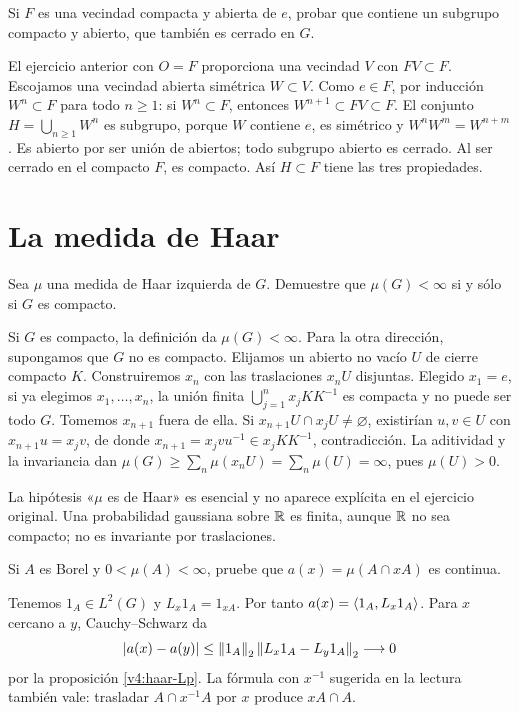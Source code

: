 \begin{ejercicio}\label{ej:v4-l16-9}
Si $F$ es una vecindad compacta y abierta de $e$, probar que contiene un subgrupo compacto y abierto, que también es cerrado en $G$.
\end{ejercicio}
\begin{solucion}
El ejercicio anterior con $O=F$ proporciona una vecindad $V$ con $FV\subset F$. Escojamos una vecindad abierta simétrica $W\subset V$. Como $e\in F$, por inducción $W^n\subset F$ para todo $n\geq1$: si $W^n\subset F$, entonces $W^{n+1}\subset FV\subset F$. El conjunto $H=\bigcup_{n\geq1}W^n$ es subgrupo, porque $W$ contiene $e$, es simétrico y $W^nW^m=W^{n+m}$. Es abierto por ser unión de abiertos; todo subgrupo abierto es cerrado. Al ser cerrado en el compacto $F$, es compacto. Así $H\subset F$ tiene las tres propiedades.
\end{solucion}

\chapter{La medida de Haar}

\begin{ejercicio}\label{ej:v4-l17-1}
Sea $\mu$ una medida de Haar izquierda de $G$. Demuestre que $\mu(G)<\infty$ si y sólo si $G$ es compacto.
\end{ejercicio}
\begin{solucion}
Si $G$ es compacto, la definición da $\mu(G)<\infty$. Para la otra dirección, supongamos que $G$ no es compacto. Elijamos un abierto no vacío $U$ de cierre compacto $K$. Construiremos $x_n$ con las traslaciones $x_nU$ disjuntas. Elegido $x_1=e$, si ya elegimos $x_1,\ldots,x_n$, la unión finita $\bigcup_{j=1}^n x_jKK^{-1}$ es compacta y no puede ser todo $G$. Tomemos $x_{n+1}$ fuera de ella. Si $x_{n+1}U\cap x_jU\ne\varnothing$, existirían $u,v\in U$ con $x_{n+1}u=x_jv$, de donde $x_{n+1}=x_jvu^{-1}\in x_jKK^{-1}$, contradicción. La aditividad y la invariancia dan
$\mu(G)\geq\sum_n\mu(x_nU)=\sum_n\mu(U)=\infty$, pues $\mu(U)>0$.

La hipótesis «$\mu$ es de Haar» es esencial y no aparece explícita en el ejercicio original. Una probabilidad gaussiana sobre $\mathbb R$ es finita, aunque $\mathbb R$ no sea compacto; no es invariante por traslaciones.
\end{solucion}

\begin{ejercicio}\label{ej:v4-l17-2}
Si $A$ es Borel y $0<\mu(A)<\infty$, pruebe que $a(x)=\mu(A\cap xA)$ es continua.
\end{ejercicio}
\begin{solucion}
Tenemos $1_A\in L^2(G)$ y $L_x1_A=1_{xA}$. Por tanto
$a(x)=\left\langle1_A,L_x1_A\right\rangle$. Para $x$ cercano a $y$, Cauchy--Schwarz da
\[
 |a(x)-a(y)|\leq\left\lVert1_A\right\rVert_2\left\lVert L_x1_A-L_y1_A\right\rVert_2\longrightarrow0
\]
por la proposición \ref{v4:haar-Lp}. La fórmula con $x^{-1}$ sugerida en la lectura también vale: trasladar $A\cap x^{-1}A$ por $x$ produce $xA\cap A$.
\end{solucion}

